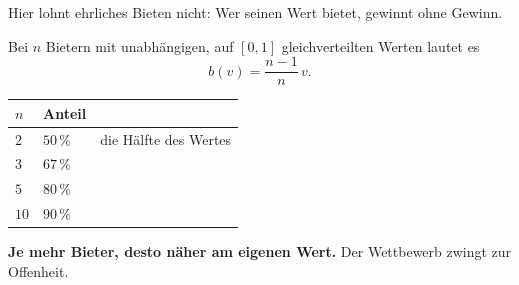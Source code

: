 \begin{merksatz}
Hier lohnt ehrliches Bieten nicht: Wer seinen Wert bietet, gewinnt ohne Gewinn.

Bei $n$ Bietern mit unabhängigen, auf $[0,1]$ gleichverteilten Werten lautet es
\[ b(v) = \frac{n-1}{n}\,v . \]

\begin{center}
{\small
\renewcommand{\arraystretch}{1.48}
\begin{tabular}{@{}P{1.6cm}P{2.2cm}P{3.0cm}@{}}
\toprule
$n$ & \textbf{Anteil} & \\
\midrule
$2$ & $50\,\%$ & die Hälfte des Wertes\\
$3$ & $67\,\%$ & \\
$5$ & $80\,\%$ & \\
$10$ & $90\,\%$ & \\
\bottomrule
\end{tabular}}
\end{center}

\begin{center}
\begin{minipage}{0.9\textwidth}
\textbf{Je mehr Bieter, desto näher am eigenen Wert.} Der Wettbewerb zwingt zur Offenheit.
\end{minipage}
\end{center}

\begin{center}
\begin{minipage}{0.88\textwidth}
\end{minipage}
\end{center}
\end{merksatz}

